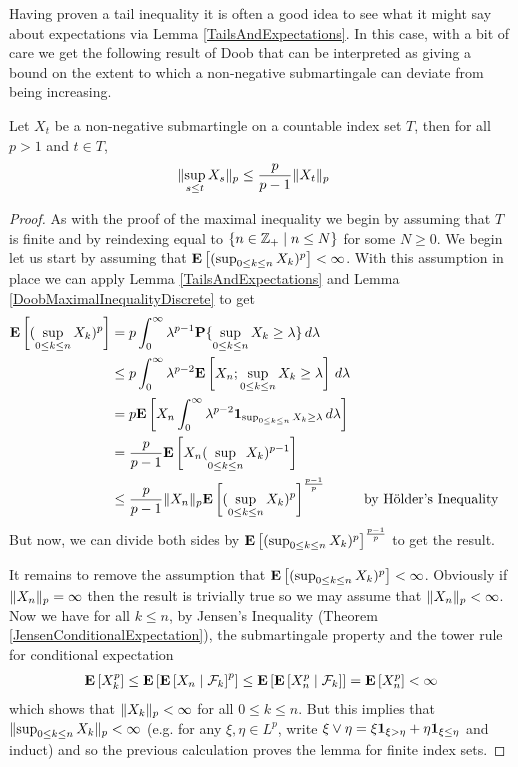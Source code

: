 Having proven a tail inequality it is often a good idea to see what it
might say about expectations via Lemma \ref{TailsAndExpectations}.  In
this case, with a bit of care we get the following result of Doob that
can be interpreted as giving a bound on the extent to which a
non-negative submartingale can deviate from being increasing.
\begin{lem}\label{DoobLpInequalityDiscrete}Let $X_t$ be a
  non-negative submartingle on a countable index set $T$, then for all
  $p > 1$ and $t \in T$,
\begin{align*}
\norm{\sup_{s \leq t} X_s}_p &\leq \frac{p}{p-1}\norm{X_t}_p
\end{align*}
\end{lem}
\begin{proof}
As with the proof of the maximal inequality we begin by assuming that
$T$ is finite and by reindexing equal to $\lbrace n \in \integers_+
\mid n \leq N\rbrace$ for some $N \geq 0$.
We begin let us start by assuming that $\expectation{(\sup_{0 \leq k
    \leq n} X_k)^p} < \infty$.  With this assumption in place we can
apply Lemma \ref{TailsAndExpectations} and Lemma
\ref{DoobMaximalInequalityDiscrete} to get
\begin{align*}
\expectation{(\sup_{0 \leq k \leq n} X_k)^p} &= p \int_0^\infty
\lambda^{p-1} \probability{\sup_{0 \leq k \leq n} X_k \geq \lambda} \,
d\lambda \\
&\leq p \int_0^\infty
\lambda^{p-2} \expectation{X_n ; \sup_{0 \leq k \leq n} X_k \geq \lambda} \,
d\lambda \\
&=p \expectation{X_n \int_0^\infty
\lambda^{p-2} \characteristic{\sup_{0 \leq k \leq n} X_k \geq \lambda} \,
d\lambda} \\
&=\frac{p}{p-1} \expectation{X_n (\sup_{0 \leq k \leq n} X_k)^{p-1} } \\
&\leq \frac{p}{p-1} \norm{X_n}_p \expectation{(\sup_{0 \leq k \leq n}
  X_k)^{p}}^{\frac{p-1}{p}} & & \text{by H\"{o}lder's Inequality}
\end{align*}
But now, we can divide both sides by $\expectation{(\sup_{0 \leq k \leq n}
  X_k)^{p}}^{\frac{p-1}{p}}$ to get the result.

It remains to remove the assumption that $\expectation{(\sup_{0 \leq k \leq n}
  X_k)^{p}} < \infty$.  Obviously if $\norm{X_n}_p = \infty$ then the
result is trivially true so we may assume that $\norm{X_n}_p < \infty$.
Now we have for all $k\leq n$, by Jensen's Inequality (Theorem \ref{JensenConditionalExpectation}), the
submartingale property and the tower rule for conditional expectation
\begin{align*}
\expectation{X_k^p} \leq
\expectation{\cexpectationlong{\mathcal{F}_k}{X_n}^p} \leq 
\expectation{\cexpectationlong{\mathcal{F}_k}{X_n^p}} =
\expectation{X_n^p} < \infty
\end{align*}
which shows that $\norm{X_k}_p < \infty$ for all $0\leq k \leq n$.
But this implies that $\norm{\sup_{0 \leq k \leq n} X_k}_p < \infty$
(e.g. for any $\xi, \eta \in L^p$, write $\xi \vee \eta =
\xi\characteristic{\xi > \eta} + \eta\characteristic{\xi \leq \eta}$
and induct) and so the previous calculation proves the lemma for
finite index sets.


\end{proof}
